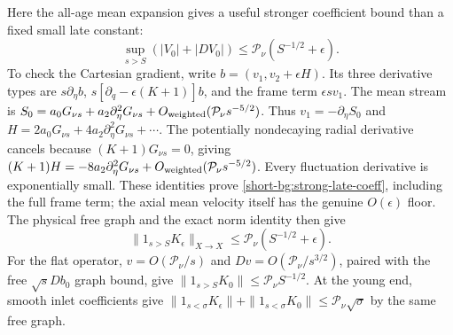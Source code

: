 Here the all-age mean expansion gives a useful stronger coefficient
bound than a fixed small late constant:
\begin{equation}
 \sup_{s>S}(|V_0|+|DV_0|)
       \le\mathcal P_\nu(S^{-1/2}+\epsilon).
 \label{short-bg:strong-late-coeff}
\end{equation}
To check the Cartesian gradient, write $b=(v_1,v_2+\epsilon H)$.
Its three derivative types are $s\partial_\eta b$,
$s[\partial_q-\epsilon(K+1)]b$, and the frame term
$\epsilon s v_1$. The mean stream is
$S_0=a_0G_{\nu s}+a_2\partial_\eta^2G_{\nu s}
+O_{\rm weighted}(\mathcal P_\nu s^{-5/2})$.
Thus $v_1=-\partial_\eta S_0$ and
$H=2a_0G_{\nu s}+4a_2\partial_\eta^2G_{\nu s}+\cdots$.
The potentially nondecaying radial derivative cancels because
$(K+1)G_{\nu s}=0$, giving
$(K+1)H=-8a_2\partial_\eta^2G_{\nu s}
+O_{\rm weighted}(\mathcal P_\nu s^{-5/2})$.
Every fluctuation derivative is exponentially small. These identities
prove \eqref{short-bg:strong-late-coeff}, including the full frame
term; the axial mean velocity itself has the genuine $O(\epsilon)$
floor. The physical free graph and the exact norm identity then give
\[
 \|1_{s>S}K_\epsilon\|_{X\to X}
 \le\mathcal P_\nu(S^{-1/2}+\epsilon).
\]
For the flat operator, $v=O(\mathcal P_\nu/s)$ and
$Dv=O(\mathcal P_\nu/s^{3/2})$, paired with the free
$\sqrt{s}Db_0$ graph bound, give
$\|1_{s>S}K_0\|\le\mathcal P_\nu S^{-1/2}$.
At the young end, smooth inlet coefficients give
$\|1_{s<\sigma}K_\epsilon\|+\|1_{s<\sigma}K_0\|
\le\mathcal P_\nu\sqrt\sigma$ by the same free graph.

